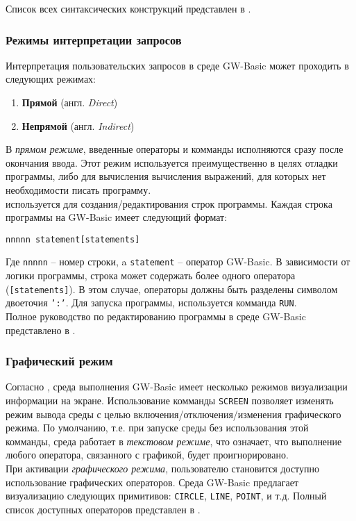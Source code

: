 \documentclass[12pt]{article}
\begin{document}
			\indent Список всех синтаксических конструкций представлен в \cite[стр.~117]{basicManual}.
			\subsubsection{Режимы интерпретации запросов}
			\label{subsec:interpTypes}
			\hspace{\parindent} Интерпретация пользовательских запросов в среде GW-Basic может проходить в следующих режимах:
			\begin{enumerate}
				\item {\bf Прямой} (англ. {\it Direct}) 
				\item {\bf Непрямой} (англ. {\it Indirect}) 
			\end{enumerate}
			
			\indent В {\it прямом режиме}, введенные операторы и комманды исполняются сразу после окончания ввода. Этот режим используется преимущественно в целях отладки программы, либо для вычисления вычисления выражений, для которых нет необходимости писать программу. \\
			 используется для создания/редактирования строк программы. Каждая строка программы на GW-Basic имеет следующий формат:
			\begin{center}
				\tt nnnnn statement[statements]
			\end{center}

			\indent	Где {\tt nnnnn} -- номер строки, a {\tt statement} -- оператор GW-Basic. В зависимости от логики программы, строка может содержать более одного оператора ({\tt [statements]}). В этом случае, операторы должны быть разделены символом двоеточия {\tt ':'}. Для запуска программы, используется комманда {\tt RUN}.\\
			\indent Полное руководство по редактированию программы в среде GW-Basic представлено в \cite[стр.~18]{basicManual}.

			\subsubsection{Графический режим}
			\hspace{\parindent} Согласно \cite[стр.~142]{basicManual}, среда выполнения GW-Basic имеет несколько режимов визуализации информации на экране. Использование комманды {\tt SCREEN} позволяет изменять режим вывода среды с целью включения/отключения/изменения графического режима. По умолчанию, т.е. при запуске среды без использования этой комманды, среда работает в {\it текстовом режиме}, что означает, что выполнение любого оператора, связанного с графикой, будет проигнорировано. \\
			\indent При активации {\it графического режима}, пользователю становится доступно использование графических операторов. Среда GW-Basic предлагает визуализацию следующих примитивов: {\tt CIRCLE}, {\tt LINE}, {\tt POINT}, и т.д. Полный список доступных операторов представлен в \cite[стр.~117]{basicManual}. 
\end{document}
